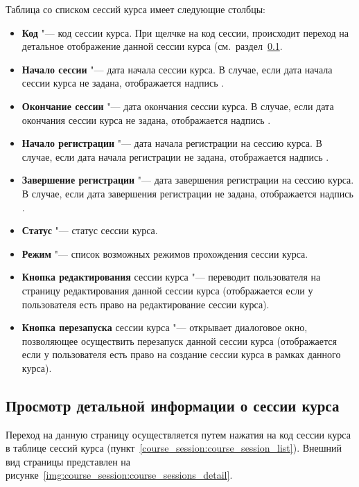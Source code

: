 	Таблица со списком сессий курса имеет следующие столбцы:
	\begin{itemize}
		\item \textbf{Код} "--- код сессии курса. При щелчке на код сессии, происходит переход на детальное отображение данной сессии курса (см.\ раздел~\ref{course_session:course_session_detail}.
		\item \textbf{Начало сессии} "--- дата начала сессии курса. В случае, если дата начала сессии курса не задана, отображается надпись .
		\item \textbf{Окончание сессии} "--- дата окончания сессии курса. В случае, если дата окончания сессии курса не задана, отображается надпись .
		\item \textbf{Начало регистрации} "--- дата начала регистрации на сессию курса. В случае, если дата начала регистрации не задана, отображается надпись .
		\item \textbf{Завершение регистрации} "--- дата завершения регистрации на сессию курса. В случае, если дата завершения регистрации не задана, отображается надпись .
		\item \textbf{Статус} "--- статус сессии курса.
		\item \textbf{Режим} "--- список возможных режимов прохождения сессии курса.
		\item \textbf{Кнопка редактирования} сессии курса  "--- переводит пользователя на страницу редактирования данной сессии курса (отображается если у пользователя есть право на редактирование сессии курса).
		\item \textbf{Кнопка перезапуска} сессии курса  "--- открывает диалоговое окно, позволяющее осуществить перезапуск данной сессии курса (отображается если у пользователя есть право на создание сессии курса в рамках данного курса).
	\end{itemize}

\subsection{Просмотр детальной информации о сессии курса}
\label{course_session:course_session_detail}
	Переход на данную страницу осуществляется путем нажатия на код сессии курса в таблице сессий курса (пункт~\ref{course_session:course_session_list}). Внешний вид страницы представлен на рисунке~\ref{img:course_session:course_sessions_detail}.
	
